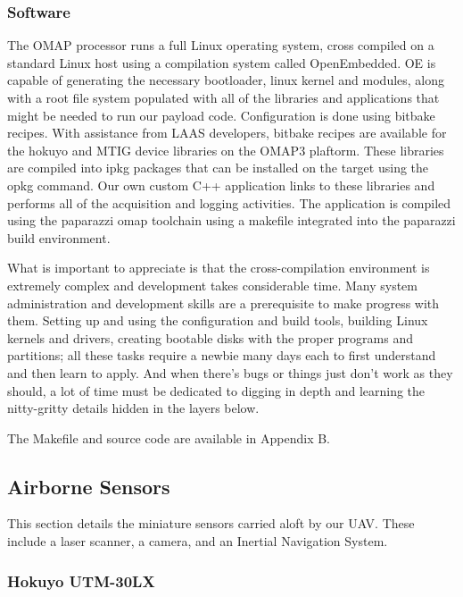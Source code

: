 \documentclass[a4paper,11pt]{report}
\begin{document}
\subsubsection{Software}

The OMAP processor runs a full Linux operating system, cross compiled on a standard Linux host using a compilation system called OpenEmbedded. OE is capable of generating the necessary bootloader, linux kernel and modules, along with a root file system populated with all of the libraries and applications that might be needed to run our payload code. Configuration is done using bitbake recipes. With assistance from LAAS developers, bitbake recipes are available for the hokuyo and MTIG device libraries on the OMAP3 plaftorm. These libraries are compiled into ipkg packages that can be installed on the target using the opkg command. Our own custom C++ application links to these libraries and performs all of the acquisition and logging activities. The application is compiled using the paparazzi omap toolchain using a makefile integrated into the paparazzi build environment.

What is important to appreciate is that the cross-compilation environment is extremely complex and development takes considerable time. Many system administration and development skills are a prerequisite to make progress with them. Setting up and using the configuration and build tools, building Linux kernels and drivers, creating bootable disks with the proper programs and partitions; all these tasks require a newbie many days each to first understand and then learn to apply. And when there's bugs or things just don't work as they should, a lot of time must be dedicated to digging in depth and learning the nitty-gritty details hidden in the layers below.

The Makefile and source code are available in Appendix B.

\subsection{Airborne Sensors}

This section details the miniature sensors carried aloft by our UAV. These include a laser scanner, a camera, and an Inertial Navigation System.

\subsubsection{Hokuyo UTM-30LX}
\label{Hokuyo}
\end{document}
